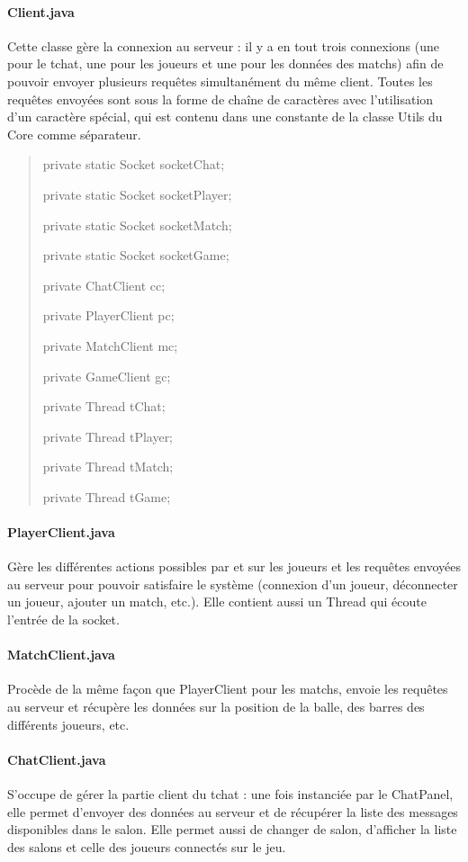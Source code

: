 \documentclass[a4paper,12pt]{report}
\begin{document}
\paragraph{Client.java}
Cette classe gère la connexion au serveur : il y a en tout trois connexions (une pour le tchat, une pour les joueurs et une pour les données des matchs) afin de pouvoir envoyer plusieurs requêtes simultanément du même client. Toutes les requêtes envoyées sont sous la forme de chaîne de caractères avec l'utilisation d'un caractère spécial, qui est contenu dans une constante de la classe Utils du Core comme séparateur.
\begin{quote}
	private static Socket socketChat;
	
	private static Socket socketPlayer;
	
	private static Socket socketMatch;
	
	private static Socket socketGame;
	
	private ChatClient cc;
	
	private PlayerClient pc;
	
	private MatchClient mc;
	
	private GameClient gc;
	
	private Thread tChat;
	
	private Thread tPlayer;
	
	private Thread tMatch;
	
	private Thread tGame;
\end{quote}
\paragraph{PlayerClient.java}
Gère les différentes actions possibles par et sur les joueurs et les requêtes envoyées au serveur pour pouvoir satisfaire le système (connexion d'un joueur, déconnecter un joueur, ajouter un match, etc.). Elle contient aussi un Thread qui écoute l'entrée de la socket.
\paragraph{MatchClient.java}
Procède de la même façon que PlayerClient pour les matchs, envoie les requêtes au serveur et récupère les données sur la position de la balle, des barres des différents joueurs, etc.
\paragraph{ChatClient.java}
S'occupe de gérer la partie client du tchat : une fois instanciée par le ChatPanel, elle permet d'envoyer des données au serveur et de récupérer la liste des messages disponibles dans le salon. Elle permet aussi de changer de salon, d'afficher la liste des salons et celle des joueurs connectés sur le jeu.
\end{document}
